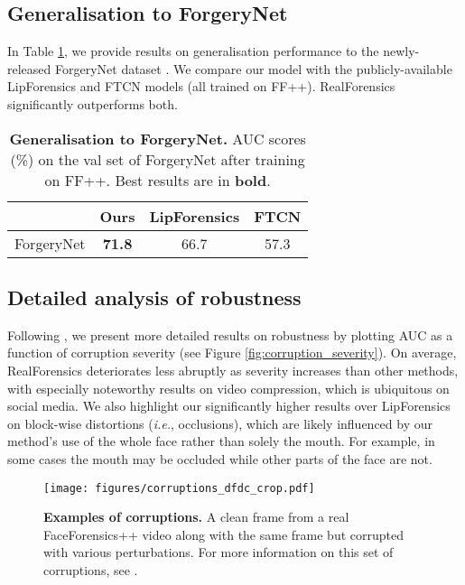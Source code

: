 \documentclass[10pt,twocolumn,letterpaper]{article}
\begin{document}
\subsection{Generalisation to ForgeryNet}
In Table \ref{table:forgerynet}, we provide results on generalisation performance to the newly-released ForgeryNet dataset \cite{he2021forgerynet}. We compare our model with the publicly-available LipForensics and FTCN models (all trained on FF++). RealForensics significantly outperforms both. 

\begin{table}
\begin{center}
\begin{tabular}{l | c c c}\toprule
 & Ours & LipForensics \cite{haliassos2021lips} & FTCN \cite{zheng2021exploring} \\ \midrule
ForgeryNet & \textbf{71.8} & 66.7 & 57.3 \\
 \bottomrule
\end{tabular}
\end{center}
\caption{\textbf{Generalisation to ForgeryNet.} AUC scores (\%) on the val set of ForgeryNet after training on FF++. Best results are in \textbf{bold}.}
\label{table:forgerynet}
\end{table}

\subsection{Detailed analysis of robustness} \label{sec:detail_robustness}
Following \cite{haliassos2021lips}, we present more detailed results on robustness by plotting AUC as a function of corruption severity (see Figure \ref{fig:corruption_severity}). On average, RealForensics deteriorates less abruptly as severity increases than other methods, with especially noteworthy results on video compression, which is ubiquitous on social media. We also highlight our significantly higher results over LipForensics on block-wise distortions (\textit{i.e.}, occlusions), which are likely influenced by our method's use of the whole face rather than solely the mouth. For example, in some cases the mouth may be occluded while other parts of the face are not.

\begin{figure}
\centering
  \centerline{\texttt{[image: figures/corruptions\_dfdc\_crop.pdf]}}
 \caption{\textbf{Examples of corruptions.} A clean frame from a real FaceForensics++ video along with the same frame but corrupted with various perturbations. For more information on this set of corruptions, see \cite{jiang2020deeperforensics}.}
 \label{fig:corruption_examples}
\end{figure}
\end{document}
